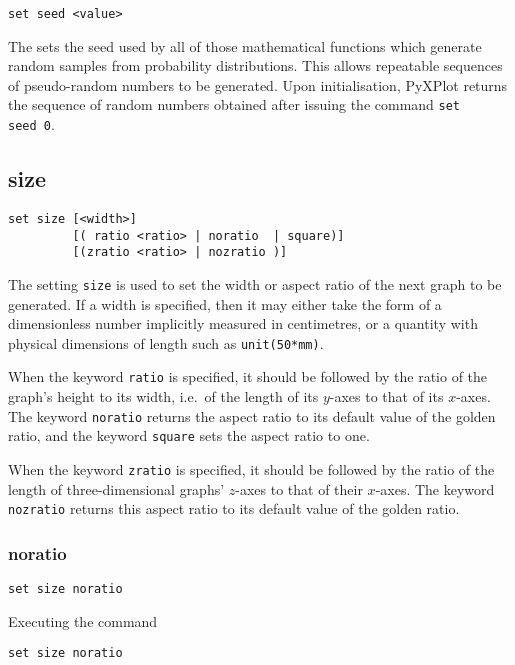 \begin{verbatim}
set seed <value>
\end{verbatim}

The  sets the seed used by all of those mathematical
functions which generate random samples from probability distributions.  This
allows repeatable sequences of pseudo-random numbers to be generated.  Upon
initialisation, PyXPlot returns the sequence of random numbers obtained after
issuing the command {\tt set seed~0}.


\subsection{size}

\begin{verbatim}
set size [<width>]
         [( ratio <ratio> | noratio  | square)]
         [(zratio <ratio> | nozratio )]
\end{verbatim}

The setting {\tt size} is used to set the width or aspect ratio of the next
graph to be generated. If a width is specified, then it may either take the
form of a dimensionless number implicitly measured in centimetres, or a
quantity with physical dimensions of length such as {\tt unit(50*mm)}.

When the keyword {\tt ratio} is specified, it should be followed by the ratio
of the graph's height to its width, i.e.\ of the length of its $y$-axes to that
of its $x$-axes. The keyword {\tt noratio} returns the aspect ratio to its
default value of the golden ratio, and the keyword {\tt square} sets the aspect
ratio to one.

When the keyword {\tt zratio} is specified, it should be followed by the ratio
of the length of three-dimensional graphs' $z$-axes to that of their $x$-axes.
The keyword {\tt nozratio} returns this aspect ratio to its default value of
the golden ratio.


\subsubsection{noratio}

\begin{verbatim}
set size noratio
\end{verbatim}

Executing the command

\begin{verbatim}
set size noratio
\end{verbatim}

